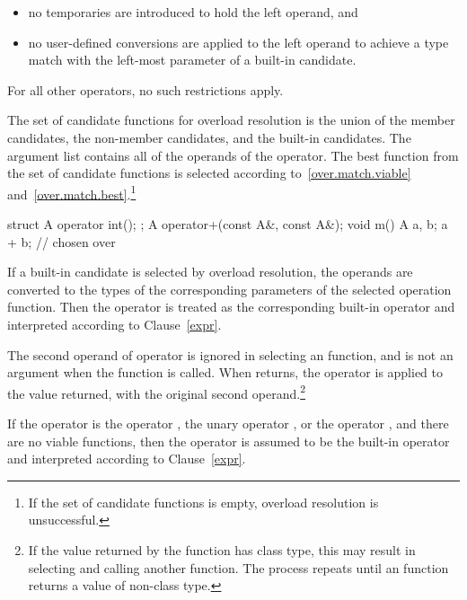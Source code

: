 \begin{itemize}
\item
no temporaries are introduced to hold the left operand, and
\item
no user-defined conversions are applied to the left operand to achieve
a type match with the left-most parameter of a built-in candidate.
\end{itemize}

\pnum
For all other operators, no such restrictions apply.

\pnum
The set of candidate functions for overload resolution is the
union of the member candidates, the non-member candidates, and
the built-in candidates.
The argument list contains all of the
operands of the operator.
The best function from the set of candidate functions is selected
according to~\ref{over.match.viable}
and~\ref{over.match.best}.\footnote{If the set of candidate functions is empty,
overload resolution is unsuccessful.}
\enterexample

\begin{codeblock}
struct A {
  operator int();
};
A operator+(const A&, const A&);
void m() {
  A a, b;
  a + b;            //  chosen over 
}
\end{codeblock}
\exitexample

\pnum
If a built-in candidate is selected by overload resolution, the
operands are converted to the types of the corresponding parameters
of the selected operation function.
Then the operator is treated as the corresponding
built-in operator and interpreted according to Clause~\ref{expr}.

\pnum
The second operand of operator
\tcode{->}
is ignored in selecting an
function, and is not an argument when the
function is called.
When
returns, the operator
\tcode{->}
is applied to the value returned, with the original second
operand.\footnote{If the value returned by the
function has class type, this may result in selecting and calling another
function.
The process repeats until an
function returns a value of non-class type.}

\pnum
If the operator is the operator
\tcode{,},
the unary operator
\tcode{\&},
or the operator
\tcode{->},
and there are no viable functions, then the operator is
assumed to be the built-in operator and interpreted according to
Clause~\ref{expr}.

